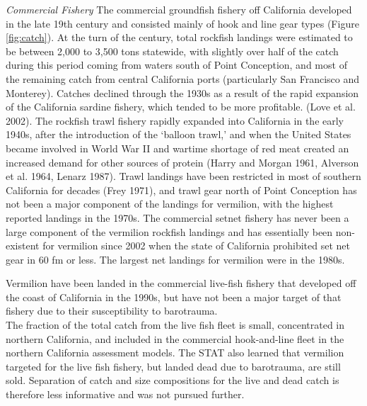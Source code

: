 \documentclass[11pt,
  english,
  a4paper,
]{article}
\begin{document}
\leavevmode\tagmcend\tagstructend

\emph{Commercial Fishery} The commercial groundfish fishery off California developed in the late 19th century and consisted mainly of hook and line gear types (Figure \ref{fig:catch}). At the turn of the century, total rockfish landings were estimated to be between 2,000 to 3,500 tons statewide, with slightly over half of the catch during this period coming from waters south of Point Conception, and most of the remaining catch from central California ports (particularly San Francisco and Monterey). Catches declined through the 1930s as a result of the rapid expansion of the California sardine fishery, which tended to be more profitable. {(Love et al. 2002)\leavevmode\tagmcend\tagstructend}. The rockfish trawl fishery rapidly expanded into California in the early 1940s, after the introduction of the `balloon trawl,' and when the United States became involved in World War II and wartime shortage of red meat created an increased demand for other sources of protein {(Harry and Morgan 1961, Alverson et al. 1964, Lenarz 1987)\leavevmode\tagmcend\tagstructend}. Trawl landings have been restricted in most of southern California for decades {(Frey 1971)\leavevmode\tagmcend\tagstructend}, and trawl gear north of Point Conception has not been a major component of the landings for vermilion, with the highest reported landings in the 1970s. The commercial setnet fishery has never been a large component of the vermilion rockfish landings and has essentially been non-existent for vermilion since 2002 when the state of California prohibited set net gear in 60 fm or less. The largest net landings for vermilion were in the 1980s.

Vermilion have been landed in the commercial live-fish fishery that developed off the coast of California in the 1990s, but have not been a major target of that fishery due to their susceptibility to barotrauma.\\
The fraction of the total catch from the live fish fleet is small, concentrated in northern California, and included in the commercial hook-and-line fleet in the northern California assessment models. The STAT also learned that vermilion targeted for the live fish fishery, but landed dead due to barotrauma, are still sold. Separation of catch and size compositions for the live and dead catch is therefore less informative and was not pursued further.
\end{document}
